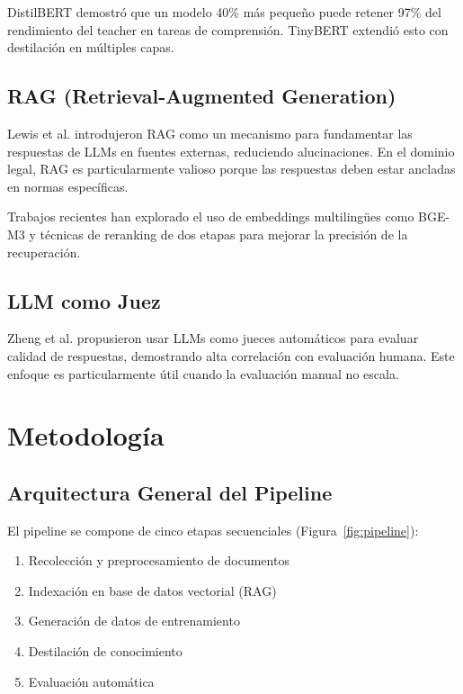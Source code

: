 \documentclass[conference]{IEEEtran}
\begin{document}
DistilBERT \cite{sanh2019distilbert} demostr\'o que un modelo 40\% m\'as peque\~no puede retener 97\% del rendimiento del teacher en tareas de comprensi\'on. TinyBERT \cite{jiao2020tinybert} extendi\'o esto con destilaci\'on en m\'ultiples capas.

\subsection{RAG (Retrieval-Augmented Generation)}

Lewis et al. \cite{lewis2020retrieval} introdujeron RAG como un mecanismo para fundamentar las respuestas de LLMs en fuentes externas, reduciendo alucinaciones. En el dominio legal, RAG es particularmente valioso porque las respuestas deben estar ancladas en normas espec\'ificas.

Trabajos recientes han explorado el uso de embeddings multiling\"ues como BGE-M3 \cite{chen2024bge} y t\'ecnicas de reranking de dos etapas \cite{nogueira2019passage} para mejorar la precisi\'on de la recuperaci\'on.

\subsection{LLM como Juez}

Zheng et al. \cite{zheng2023judging} propusieron usar LLMs como jueces autom\'aticos para evaluar calidad de respuestas, demostrando alta correlaci\'on con evaluaci\'on humana. Este enfoque es particularmente \'util cuando la evaluaci\'on manual no escala.

\section{Metodolog\'ia}
\label{sec:methodology}

\subsection{Arquitectura General del Pipeline}

El pipeline se compone de cinco etapas secuenciales (Figura~\ref{fig:pipeline}):

\begin{enumerate}
    \item Recolecci\'on y preprocesamiento de documentos
    \item Indexaci\'on en base de datos vectorial (RAG)
    \item Generaci\'on de datos de entrenamiento
    \item Destilaci\'on de conocimiento
    \item Evaluaci\'on autom\'atica
\end{enumerate}
\end{document}
